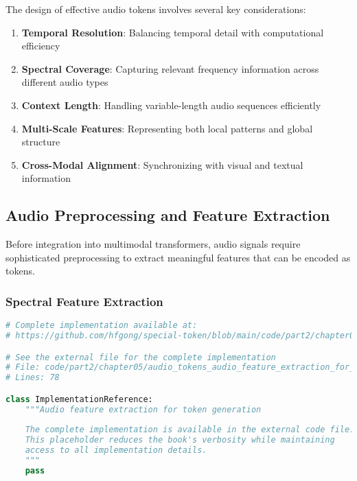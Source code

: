 The design of effective audio tokens involves several key considerations:

\begin{enumerate}
\item \textbf{Temporal Resolution}: Balancing temporal detail with computational efficiency
\item \textbf{Spectral Coverage}: Capturing relevant frequency information across different audio types
\item \textbf{Context Length}: Handling variable-length audio sequences efficiently
\item \textbf{Multi-Scale Features}: Representing both local patterns and global structure
\item \textbf{Cross-Modal Alignment}: Synchronizing with visual and textual information
\end{enumerate}

\subsection{Audio Preprocessing and Feature Extraction}

Before integration into multimodal transformers, audio signals require sophisticated preprocessing to extract meaningful features that can be encoded as tokens.
\begin{comment}
Feedback: It would be helpful to briefly explain *why* raw audio is not used. For example: "Raw audio waveforms are sampled at very high rates (e.g., 16,000+ samples per second), resulting in extremely long sequences that are computationally infeasible for standard transformers. Therefore, the first step is always to convert the raw audio into a more compressed and meaningful feature representation, such as a spectrogram, which captures the frequency content over time."
\end{comment}

\subsubsection{Spectral Feature Extraction}

\begin{lstlisting}[language=Python, caption={Audio feature extraction for token generation}]
# Complete implementation available at:
# https://github.com/hfgong/special-token/blob/main/code/part2/chapter05/audio_tokens_audio_feature_extraction_for_t.py

# See the external file for the complete implementation
# File: code/part2/chapter05/audio_tokens_audio_feature_extraction_for_t.py
# Lines: 78

class ImplementationReference:
    """Audio feature extraction for token generation
    
    The complete implementation is available in the external code file.
    This placeholder reduces the book's verbosity while maintaining
    access to all implementation details.
    """
    pass
\end{lstlisting}

